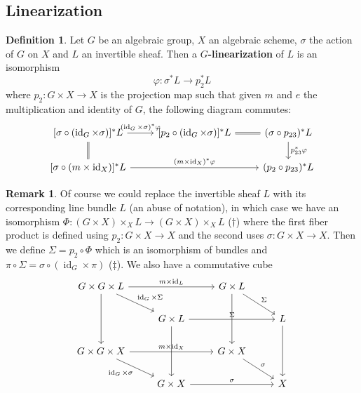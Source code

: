 \documentclass[12pt]{report}
\theoremstyle{remark}
\theoremstyle{definition}
\newtheorem{remark}{Remark}[section]
\newtheorem{definition}{Definition}[section]
\newcommand{\s}[0]{\sigma}
\newcommand{\id}[0]{\operatorname{id}}
\begin{document}
    \subsection{Linearization}
    \begin{definition}
        Let $G$ be an algebraic group, $X$ an algebraic scheme, $\s$ the action of $G$ on $X$ and $L$ an invertible sheaf. Then a \textbf{$G$-linearization} of $L$ is an isomorphism
        \[\varphi:\s^*L\to p_2^*L\]
        where $p_2:G\times X\to X$ is the projection map such that given $m$ and $e$ the multiplication and identity of $G$, the following diagram commutes:
        \[
        \begin{tikzcd}
                {[\sigma\circ(\id_G\times\sigma)]^*L} \arrow[r, "(\id_G\times\sigma)^*\varphi"] \arrow[d,Rightarrow, no head] & {[p_2\circ(\id_G\times\sigma)]^*L} \arrow[r, Rightarrow, no head] & (\sigma\circ p_{23})^*L \arrow[d, "p_{23}^*\varphi"] \\
                {[\s\circ(m\times \id_X)]^*L} \arrow[rr, "(m\times\id_X)^*\varphi"]                                            &                                                                   & (p_2\circ p_{23})^*L                                
        \end{tikzcd}
        \]
    \end{definition}
    \begin{remark}
        Of course we could replace the invertible sheaf $L$ with its corresponding line bundle $L$ (an abuse of notation), in which case we have an isomorphism $\Phi:(G\times X)\times_X  L\to (G\times X)\times_X L$ ($\dagger$) where the first fiber product is defined using $p_2:G\times X\to X$ and the second uses $\s:G\times X\to X$. Then we define $\Sigma=p_2\circ\Phi$ which is an isomorphism of bundles and $\pi\circ\Sigma=\s\circ(\id_G\times\pi)$ ($\ddagger$). We also have a commutative cube
        \[
            \begin{tikzcd}
                G\times G\times L \arrow[rd, "\id_G\times\Sigma"] \arrow[dd] \arrow[rr, "m\times\id_L"] &                                           & G\times L \arrow[rd, "\Sigma"] \arrow[dd] &              \\
                                                                                                        & G\times L \arrow[rr, "\Sigma"] \arrow[dd] &                                           & L \arrow[dd] \\
                G\times G\times X \arrow[rd, "\id_G\times\s"'] \arrow[rr, "m\times\id_X"]               &                                           & G\times X \arrow[rd, "\s"]                &              \\
                                                                                                        & G\times X \arrow[rr, "\s"]                &                                           & X           
                \end{tikzcd}
        \]
    \end{remark}
\end{document}

